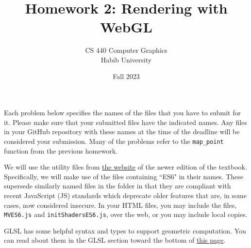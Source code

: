 \documentclass[addpoints]{exam}
\title{Homework 2: Rendering with WebGL}
\author{CS 440 Computer Graphics\\Habib University}
\date{Fall 2023}
\begin{document}
\maketitle

Each problem below specifies the names of the files that you have to submit for it. Please make sure that your submitted files have the indicated names. Any files in your GitHub repository with these names at the time of the deadline will be considered your submission. Many of the problems refer to the {\tt map\_point} function from the previous homework.

We will use the utility files from \href{https://bit.ly/3Bqt8XG}{the website} of the newer edition of the textbook. Specifically, we will make use of the files containing ``ES6" in their names. These supersede similarly named files in the folder in that they are compliant with recent JavaScript (JS) standards which deprecate older features that are, in some cases, now considered insecure. In your HTML files, you may include the files, \texttt{MVES6.js} and \texttt{initShadersES6.js}, over the web, or you may include local copies.

GLSL has some helpful syntax and types to support geometric computation. You can read about them in the GLSL section toward the bottom of \href{https://webgl2fundamentals.org/webgl/lessons/webgl-shaders-and-glsl.html}{this page}.

  
\end{document}
